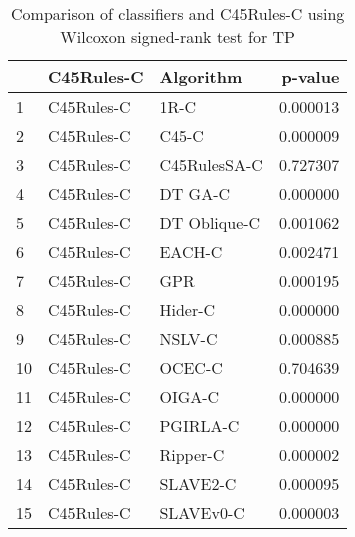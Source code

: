 \begin{table}
\footnotesize
\caption{Comparison of classifiers and C45Rules-C using Wilcoxon signed-rank test for TP}
\label{tab:C45Rules-C wilcoxon TP comparison}
\begin{tabular}{lllr}
\hline
 & C45Rules-C & Algorithm & p-value \\
\hline
1 & C45Rules-C & 1R-C & 0.000013 \\
2 & C45Rules-C & C45-C & 0.000009 \\
3 & C45Rules-C & C45RulesSA-C & 0.727307 \\
4 & C45Rules-C & DT GA-C & 0.000000 \\
5 & C45Rules-C & DT Oblique-C & 0.001062 \\
6 & C45Rules-C & EACH-C & 0.002471 \\
7 & C45Rules-C & GPR & 0.000195 \\
8 & C45Rules-C & Hider-C & 0.000000 \\
9 & C45Rules-C & NSLV-C & 0.000885 \\
10 & C45Rules-C & OCEC-C & 0.704639 \\
11 & C45Rules-C & OIGA-C & 0.000000 \\
12 & C45Rules-C & PGIRLA-C & 0.000000 \\
13 & C45Rules-C & Ripper-C & 0.000002 \\
14 & C45Rules-C & SLAVE2-C & 0.000095 \\
15 & C45Rules-C & SLAVEv0-C & 0.000003 \\
\hline
\end{tabular}
\end{table}
